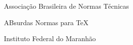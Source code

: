 \begin{siglas}
  \item[ABNT] Associação Brasileira de Normas Técnicas
  \item[abnTeX] ABsurdas Normas para TeX
  \item[IFMA]Instituto Federal do Maranhão
\end{siglas}